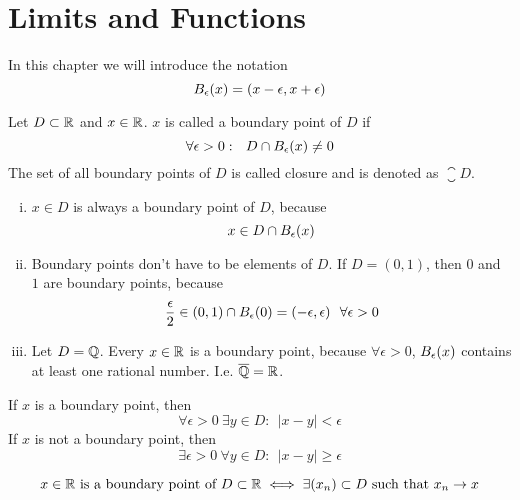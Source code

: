 \documentclass[../script.tex]{subfiles}
\begin{document}
\section{Limits and Functions}

In this chapter we will introduce the notation
\[
    B_{\epsilon}(x) = (x - \epsilon, x + \epsilon)
\]

\begin{defi}
    Let $D \subset \mathbb{R}$ and $x \in \mathbb{R}$. $x$ is called a boundary point of $D$ if 
    \[
        \forall \epsilon > 0: ~~D \cap B_{\epsilon}(x) \ne 0
    \]
    The set of all boundary points of $D$ is called closure and is denoted as $\closure{D}$.
\end{defi}

\begin{eg}
    \begin{enumerate}[(i)]
        \item $x \in D$ is always a boundary point of $D$, because 
        \[
            x \in D \cap B_{\epsilon}(x)
        \]

        \item Boundary points don't have to be elements of $D$. If $D = (0, 1)$, then $0$ and $1$ are boundary points, because 
        \[
            \frac{\epsilon}{2} \in (0, 1) \cap B_{\epsilon}(0) = (-\epsilon, \epsilon) ~~\forall \epsilon > 0
        \]

        \item Let $D = \mathbb{Q}$. Every $x \in \mathbb{R}$ is a boundary point, because $\forall \epsilon > 0$, $B_{\epsilon}(x)$ contains at least one rational number. I.e. $\overline{\mathbb{Q}} = \mathbb{R}$.
    \end{enumerate}
\end{eg}

\begin{rem}
    If $x$ is a boundary point, then 
    \[
        \forall \epsilon > 0 ~\exists y \in D: ~~|x - y| < \epsilon 
    \]
    If $x$ is not a boundary point, then 
    \[
        \exists \epsilon > 0 ~\forall y \in D: ~~|x - y| \ge \epsilon 
    \]
\end{rem}

\begin{thm}
    \[
        x \in \mathbb{R} \text{ is a boundary point of } D \subset \mathbb{R} \iff \exists (x_n) \subset D \text{ such that } x_n \rightarrow x
    \]
\end{thm}
\end{document}
